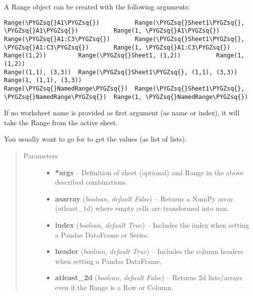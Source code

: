 \documentclass[letterpaper,11pt,english]{sphinxmanual}
\def\PYGZsq{\char`\'}
\begin{document}
\begin{fulllineitems}
\label{range:xlwings.Range}
A Range object can be created with the following arguments:

\begin{Verbatim}[commandchars=\\\{\}]
Range(\PYGZsq{}A1\PYGZsq{})          Range(\PYGZsq{}Sheet1\PYGZsq{}, \PYGZsq{}A1\PYGZsq{})          Range(1, \PYGZsq{}A1\PYGZsq{})
Range(\PYGZsq{}A1:C3\PYGZsq{})       Range(\PYGZsq{}Sheet1\PYGZsq{}, \PYGZsq{}A1:C3\PYGZsq{})       Range(1, \PYGZsq{}A1:C3\PYGZsq{})
Range((1,2))         Range(\PYGZsq{}Sheet1, (1,2))          Range(1, (1,2))
Range((1,1), (3,3))  Range(\PYGZsq{}Sheet1\PYGZsq{}, (1,1), (3,3))  Range(1, (1,1), (3,3))
Range(\PYGZsq{}NamedRange\PYGZsq{})  Range(\PYGZsq{}Sheet1\PYGZsq{}, \PYGZsq{}NamedRange\PYGZsq{})  Range(1, \PYGZsq{}NamedRange\PYGZsq{})
\end{Verbatim}

If no worksheet name is provided as first argument (as name or index),
it will take the Range from the active sheet.

You usually want to go for  to get the values (as list of lists).
\begin{quote}\begin{description}
\item[{Parameters}] \leavevmode\begin{itemize}
\item {} 
\textbf{*args} -- 
Definition of sheet (optional) and Range in the above described combinations.


\item {} 
\textbf{asarray} (\emph{boolean, default False}) -- Returns a NumPy array (atleast\_1d) where empty cells are transformed into nan.

\item {} 
\textbf{index} (\emph{boolean, default True}) -- Includes the index when setting a Pandas DataFrame or Series.

\item {} 
\textbf{header} (\emph{boolean, default True}) -- Includes the column headers when setting a Pandas DataFrame.

\item {} 
\textbf{atleast\_2d} (\emph{boolean, default False}) -- Returns 2d lists/arrays even if the Range is a Row or Column.


\end{itemize}
\end{description}
\end{quote}
\end{fulllineitems}
\end{document}
